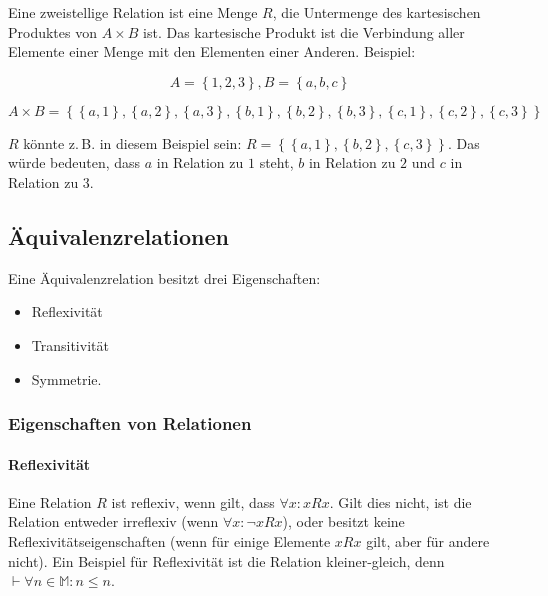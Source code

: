 \documentclass{scrartcl}
\begin{document}
Eine zweistellige Relation ist eine Menge $R$, die Untermenge des 
kartesischen Produktes von 
$A \times B$ ist. Das kartesische Produkt ist die Verbindung aller Elemente einer 
Menge mit den Elementen einer Anderen. Beispiel:

\begin{equation}
	A = \left\{1, 2, 3\right\}, B = \left\{a, b, c\right\}
\end{equation}

\begin{equation}
	A \times B = \left\{
		\left\{a, 1\right\}, \left\{a, 2\right\}, \left\{a, 3\right\},
		\left\{b, 1\right\}, \left\{b, 2\right\}, \left\{b, 3\right\},
		\left\{c, 1\right\}, \left\{c, 2\right\}, \left\{c, 3\right\}
	\right\}
\end{equation}

$R$ könnte z.\,B. in diesem Beispiel sein: $R = \left\{
	\left\{a, 1\right\}, \left\{b, 2\right\}, \left\{c, 3\right\}
\right\}$. Das würde bedeuten, dass $a$ in Relation zu $1$ steht, $b$ in Relation zu
$2$ und $c$ in Relation zu $3$.

\subsection{Äquivalenzrelationen}

Eine Äquivalenzrelation besitzt drei Eigenschaften:

\begin{itemize}
	\item Reflexivität
	\item Transitivität
	\item Symmetrie.
\end{itemize}

\subsubsection{Eigenschaften von Relationen}

\paragraph{Reflexivität} Eine Relation $R$ ist reflexiv, wenn gilt, dass $\forall x: xRx$. Gilt dies nicht, ist die Relation entweder irreflexiv (wenn $\forall x: \lnot xRx$), oder 
besitzt keine Reflexivitätseigenschaften (wenn für einige Elemente $xRx$ gilt, aber für andere nicht).
Ein Beispiel für Reflexivität ist die Relation kleiner-gleich, denn $\vdash \forall n \in \mathbb{M}: n \leq n$.
\end{document}
